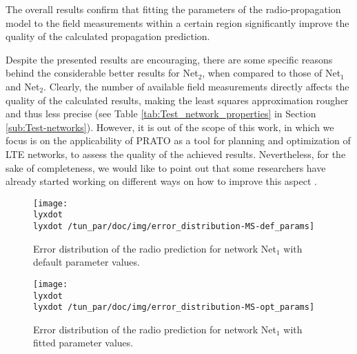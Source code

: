 The overall results confirm that fitting the parameters of the radio-propagation
model to the field measurements within a certain region significantly
improve the quality of the calculated propagation prediction.

Despite the presented results are encouraging, there are some specific
reasons behind the considerable better results for Net$_{2}$, when
compared to those of Net$_{1}$ and Net$_{2}$. Clearly, the number
of available field measurements directly affects the quality of the
calculated results, making the least squares approximation rougher
and thus less precise (see Table \ref{tab:Test_network_properties}
in Section \ref{sub:Test-networks}). However, it is out of the scope
of this work, in which we focus is on the applicability of PRATO as
a tool for planning and optimization of LTE networks, to assess the
quality of the achieved results. Nevertheless, for the sake of completeness,
we would like to point out that some researchers have already started
working on different ways on how to improve this aspect \cite{Neuland_Influence_of_Different_Factors_on_X_Map_Estimation_in_LTE:2011,Neuland_Influence_of_positioning_error_on_X_Map_estimation_in_LTE:2011}.

\begin{figure*}
\begin{minipage}[t]{0.49\textwidth}%
\centering

\texttt{[image: \\lyxdot \\lyxdot /tun\_par/doc/img/error\_distribution-MS-def\_params]}

\caption{Error distribution of the radio prediction for network Net$_{1}$
with default parameter values.\label{fig:error_distribution_default_parameters-Net1}}
%
\end{minipage}\hfill{}%
\begin{minipage}[t]{0.49\textwidth}%
\centering

\texttt{[image: \\lyxdot \\lyxdot /tun\_par/doc/img/error\_distribution-MS-opt\_params]}

\caption{Error distribution of the radio prediction for network Net$_{1}$
with fitted parameter values.\label{fig:error_distribution_optimal_parameters-Net1}}
%
\end{minipage}
\end{figure*}


